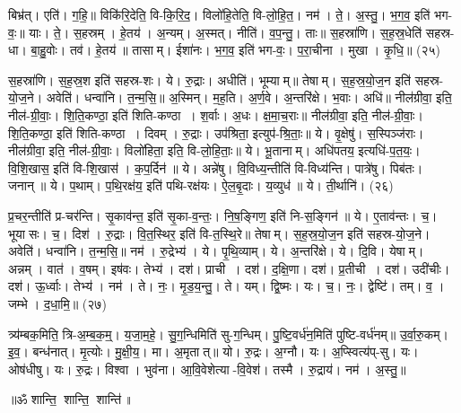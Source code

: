 बिभ्र॑त्। एति॑। ग॒हि॒॥ 
विकि॑रि॒देति॒ वि-कि॒रि॒द॒। विलो॑हि॒तेति॒ वि-लो॒हि॒त॒। नम॑। ते॒। अ॒स्तु॒। भ॒ग॒व॒ इति॑ भग-वः॒॥ 
याः। ते॒। स॒हस्रम्। हे॒तय॑। अ॒न्यम्। अ॒स्मत्। नीति॑। व॒प॒न्तु॒। ताः॥ 
स॒हस्रा॑णि। स॒ह॒स्र॒धेति॑ सहस्र-धा। बा॒हु॒वोः। तव॑। हे॒तय॑॥ 
तासाम्। ईशा॑नः। भ॒ग॒व॒ इति॑ भग-वः॒। प॒रा॒चीना। मुखा। कृ॒धि॒॥ (२५)


स॒हस्रा॑णि। स॒ह॒स्र॒श इति॑ सहस्र-शः। ये। रु॒द्राः। अधीति॑। भूम्याम्॥ 
तेषाम्। स॒ह॒स्र॒यो॒ज॒न इति॑ सहस्र-यो॒ज॒ने। अवेति॑। धन्वा॑नि। त॒न्म॒सि॒॥ 
अ॒स्मिन्। म॒ह॒ति। अ॒र्ण॒वे। अ॒न्तरि॑क्षे। भ॒वाः। अधि॑॥ 
नील॑ग्रीवा॒ इति॒ नील॑-ग्री॒वाः॒। शि॒ति॒कण्ठा॒ इति॑ शिति-कण्ठा। श॒र्वाः। अ॒धः। क्ष॒मा॒च॒राः॥ 
नील॑ग्रीवा॒ इति॒ नील॑-ग्री॒वाः॒। शि॒ति॒कण्ठा॒ इति॑ शिति-कण्ठा। दिवम्। रु॒द्राः। उप॑श्रिता॒ इत्युप॑-श्रि॒ताः॒॥ 
ये। वृ॒क्षेषु॑। स॒स्पिञ्ज॑राः। नील॑ग्रीवा॒ इति॒ नील॑-ग्री॒वाः॒। विलो॑हिता॒ इति॒ वि-लो॒हि॒ताः॒॥ 
ये। भू॒तानाम्। अधि॑पतय॒ इत्यधि॑-प॒त॒यः॒। वि॒शि॒खास॒ इति॑ वि-शि॒खास॑। क॒प॒र्दिन॑॥ 
ये। अन्ने॑षु। वि॒विध्य॒न्तीति॑ वि-विध्य॑न्ति। पात्रे॑षु। पिब॑तः। जनान्॥ 
ये। प॒थाम्। प॒थि॒रक्ष॑य॒ इति॑ पथि-रक्ष॑यः। ऐ॒ल॒बृ॒दाः। य॒व्युध॑॥ 
ये। ती॒र्थानि॑। (२६)


प्र॒चर॒न्तीति॑ प्र-चर॑न्ति। सृ॒काव॑न्त॒ इति॑ सृ॒का-व॒न्तः॒। नि॒ष॒ङ्गिण॒ इति॑ नि-स॒ङ्गिन॑॥ 
ये। ए॒ताव॑न्तः। च॒। भूयासः। च॒। दिश॑। रु॒द्राः। वि॒त॒स्थिर॒ इति॑ वि-त॒स्थि॒रे॥ 
तेषाम्। स॒ह॒स्र॒यो॒ज॒न इति॑ सहस्र-यो॒ज॒ने। अवेति॑। धन्वा॑नि। त॒न्म॒सि॒॥ 
नम॑। रु॒द्रेभ्य॑। ये। पृ॒थि॒व्याम्। ये। अ॒न्तरि॑क्षे। ये। दि॒वि। येषाम्। अन्नम्। वात॑। व॒\ar{}षम्।
 इष॑वः। तेभ्य॑। दश॑। प्राची। दश॑। द॒क्षि॒णा। दश॑। प्र॒तीची। दश॑। उदी॑चीः। दश॑। ऊ॒र्ध्वाः।
  तेभ्य॑। नम॑। ते। नः॒। मृ॒ड॒य॒न्तु॒। ते। यम्। द्वि॒ष्मः। यः। च॒। नः॒। द्वेष्टि॑। तम्। व॒। जम्भे। द॒धा॒मि॒॥ (२७)

त्र्य॑म्बक॒मिति॒ त्रि-अ॒म्ब॒क॒म्॒। य॒जा॒म॒हे॒। सु॒ग॒न्धिमिति॑ सु-ग॒न्धिम्। पु॒ष्टि॒वर्ध॑न॒मिति॑ पुष्टि-वर्ध॑नम्॥ 
उ॒र्वा॒रु॒कम्। इ॒व॒। बन्ध॑नात्। मृ॒त्योः। मु॒क्षी॒य॒। मा। अ॒मृतात्॥ 
यो। रु॒द्रः। अ॒ग्नौ। यः। अ॒प्स्वित्य॑प्-सु। यः। ओष॑धीषु। यः। रु॒द्रः। विश्वा। भुव॑ना। आ॒वि॒वेशेत्या-वि॒वेश॑। तस्मै। रु॒द्राय॑। नम॑। अ॒स्तु॒॥

\centerline{॥ॐ शान्ति॒ शान्ति॒ शान्ति॑॥}


